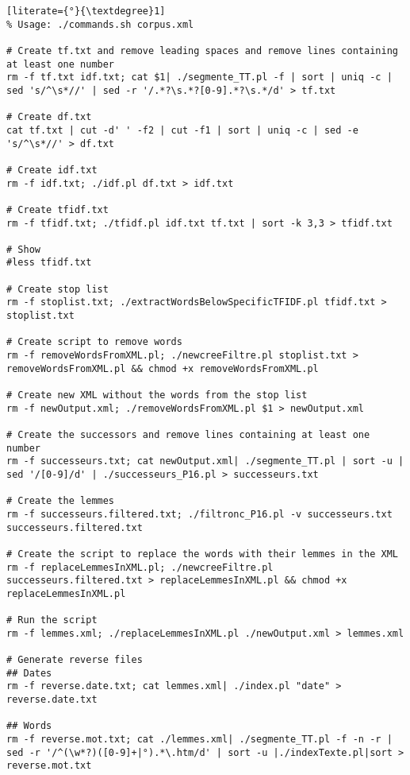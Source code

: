 \begin{lstlisting}[literate={°}{\textdegree}1]
% Usage: ./commands.sh corpus.xml

# Create tf.txt and remove leading spaces and remove lines containing at least one number
rm -f tf.txt idf.txt; cat $1| ./segmente_TT.pl -f | sort | uniq -c | sed 's/^\s*//' | sed -r '/.*?\s.*?[0-9].*?\s.*/d' > tf.txt

# Create df.txt
cat tf.txt | cut -d' ' -f2 | cut -f1 | sort | uniq -c | sed -e 's/^\s*//' > df.txt

# Create idf.txt
rm -f idf.txt; ./idf.pl df.txt > idf.txt

# Create tfidf.txt
rm -f tfidf.txt; ./tfidf.pl idf.txt tf.txt | sort -k 3,3 > tfidf.txt

# Show
#less tfidf.txt

# Create stop list
rm -f stoplist.txt; ./extractWordsBelowSpecificTFIDF.pl tfidf.txt > stoplist.txt

# Create script to remove words
rm -f removeWordsFromXML.pl; ./newcreeFiltre.pl stoplist.txt > removeWordsFromXML.pl && chmod +x removeWordsFromXML.pl

# Create new XML without the words from the stop list
rm -f newOutput.xml; ./removeWordsFromXML.pl $1 > newOutput.xml

# Create the successors and remove lines containing at least one number
rm -f successeurs.txt; cat newOutput.xml| ./segmente_TT.pl | sort -u | sed '/[0-9]/d' | ./successeurs_P16.pl > successeurs.txt

# Create the lemmes
rm -f successeurs.filtered.txt; ./filtronc_P16.pl -v successeurs.txt successeurs.filtered.txt

# Create the script to replace the words with their lemmes in the XML
rm -f replaceLemmesInXML.pl; ./newcreeFiltre.pl successeurs.filtered.txt > replaceLemmesInXML.pl && chmod +x replaceLemmesInXML.pl

# Run the script
rm -f lemmes.xml; ./replaceLemmesInXML.pl ./newOutput.xml > lemmes.xml

# Generate reverse files
## Dates
rm -f reverse.date.txt; cat lemmes.xml| ./index.pl "date" > reverse.date.txt

## Words
rm -f reverse.mot.txt; cat ./lemmes.xml| ./segmente_TT.pl -f -n -r | sed -r '/^(\w*?)([0-9]+|°).*\.htm/d' | sort -u |./indexTexte.pl|sort > reverse.mot.txt
\end{lstlisting}
